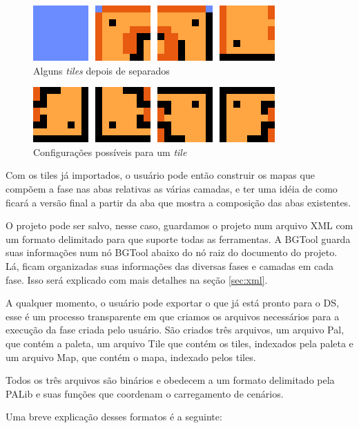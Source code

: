 \documentclass[brazil]{abnt}
\begin{document}
\begin{figure}[h!]
\centering
\includegraphics[scale=1]{imgs/tiles1.png}
\caption{Alguns \textit{tiles} depois de separados} 
\end{figure}

\begin{figure}[h!]
\centering
\includegraphics[scale=1]{imgs/tiles2.png}
\caption{Configurações possíveis para um \textit{tile}} 
\end{figure}

Com os tiles já importados, o usuário pode então construir os mapas que compõem a fase nas abas relativas as várias camadas, e ter uma idéia de como ficará a versão final a partir da aba que mostra a composição das abas existentes.

O projeto pode ser salvo, nesse caso, guardamos o projeto num arquivo XML com um formato delimitado para que suporte todas as ferramentas. A BGTool guarda suas informações num nó BGTool abaixo do nó raiz do documento do projeto. Lá, ficam organizadas suas informações das diversas fases e camadas em cada fase. Isso será explicado com mais detalhes na seção \ref{sec:xml}.

A qualquer momento, o usuário pode exportar o que já está pronto para o DS, esse é um processo transparente em que criamos os arquivos necessários para a execução da fase criada pelo usuário. São criados três arquivos, um arquivo Pal, que contém a paleta, um arquivo Tile que contém os tiles, indexados pela paleta e um arquivo Map, que contém o mapa, indexado pelos tiles.

Todos os três arquivos são binários e obedecem a um formato delimitado pela PALib e suas funções que coordenam o carregamento de cenários.

Uma breve explicação desses formatos é a seguinte:
\end{document}
